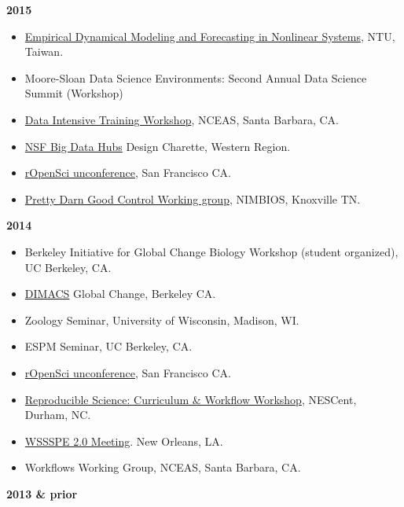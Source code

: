 \documentclass[10pt,sans]{moderncv}        %
\providecommand{\tightlist}{%
    \setlength{\itemsep}{0pt}\setlength{\parskip}{0pt}}
\begin{document}
\textbf{2015}

\begin{itemize}
\tightlist
\item
  \href{http://ecows.oc.ntu.edu.tw/itnlws/}{Empirical Dynamical Modeling
  and Forecasting in Nonlinear Systems}, NTU, Taiwan.
\item
  Moore-Sloan Data Science Environments: Second Annual Data Science
  Summit (Workshop)
\item
  \href{https://github.com/NCEAS/ds-workshop-2015}{Data Intensive
  Training Workshop}, NCEAS, Santa Barbara, CA.
\item
  \href{http://www.nsf.gov/pubs/2015/nsf15562/nsf15562.htm}{NSF Big Data
  Hubs} Design Charette, Western Region.
\item
  \href{http://unconf.ropensci.org/}{rOpenSci unconference}, San
  Francisco CA.
\item
  \href{http://www.nimbios.org/workinggroups/WG_PDG}{Pretty Darn Good
  Control Working group}, NIMBIOS, Knoxville TN.
\end{itemize}

\textbf{2014}

\begin{itemize}
\tightlist
\item
  Berkeley Initiative for Global Change Biology Workshop (student
  organized), UC Berkeley, CA.
\item
  \href{http://dimacs.rutgers.edu/Workshops/GlobalChange/announcement.html}{DIMACS}
  Global Change, Berkeley CA.
\item
  Zoology Seminar, University of Wisconsin, Madison, WI.
\item
  ESPM Seminar, UC Berkeley, CA.
\item
  \href{http://ropensci.org/blog/2014/05/14/ropenhack/}{rOpenSci
  unconference}, San Francisco CA.
\item
  \href{https://github.com/Reproducible-Science-Curriculum/Reproducible-Science-Hackathon-Dec-08-2014}{Reproducible
  Science: Curriculum \& Workflow Workshop}, NESCent, Durham, NC.
\item
  \href{http://wssspe.researchcomputing.org.uk/wssspe2/}{WSSSPE 2.0
  Meeting}. New Orleans, LA.
\item
  Workflows Working Group, NCEAS, Santa Barbara, CA.
\end{itemize}

\textbf{2013 \& prior}
\end{document}
